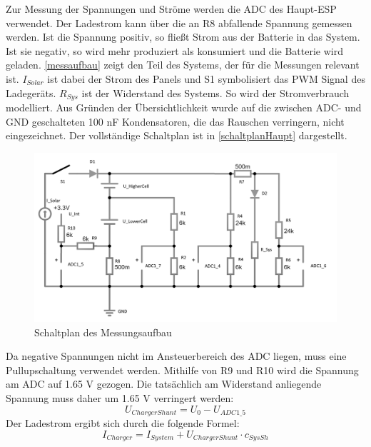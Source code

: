 \documentclass[12pt,a4paper,bibliography=totocnumbered,listof=totocnumbered]{article}
\begin{document}
Zur Messung der Spannungen und Ströme werden die ADC des Haupt-ESP verwendet.
Der Ladestrom kann über die an R8 abfallende Spannung gemessen werden.
Ist die Spannung positiv, so fließt Strom aus der Batterie in das System. Ist sie negativ, so wird mehr produziert als konsumiert und die Batterie wird geladen.
\autoref{messaufbau} zeigt den Teil des Systems, der für die Messungen relevant ist.
$I_{Solar}$ ist dabei der Strom des Panels und S1 symbolisiert das PWM Signal des Ladegeräts.
$R_{Sys}$ ist der Widerstand des Systems.
So wird der Stromverbrauch modelliert.
Aus Gründen der Übersichtlichkeit wurde auf die zwischen ADC- und GND geschalteten 100 nF Kondensatoren, die das Rauschen verringern, nicht eingezeichnet.
Der vollständige Schaltplan ist in \autoref{schaltplanHaupt} dargestellt.

\begin{figure}[htpb] %
    \centering
    \includegraphics[width=16cm,keepaspectratio=true]{pics/measuring.png}
    \caption{Schaltplan des Messungsaufbau}
    \label{messaufbau}
\end{figure}

Da negative Spannungen nicht im Ansteuerbereich des ADC liegen, muss eine Pullupschaltung verwendet werden.
Mithilfe von R9 und R10 wird die Spannung am ADC auf 1.65 V gezogen.
Die tatsächlich am Widerstand anliegende Spannung muss daher um 1.65 V verringert werden:
$$ U_{ChargerShunt} = U_{0} - U_{ADC1\_5} $$
Der Ladestrom  ergibt sich durch die folgende Formel:
$$ I_{Charger} = I_{System} + U_{ChargerShunt} \cdot c_{SysSh}  $$
\end{document}
